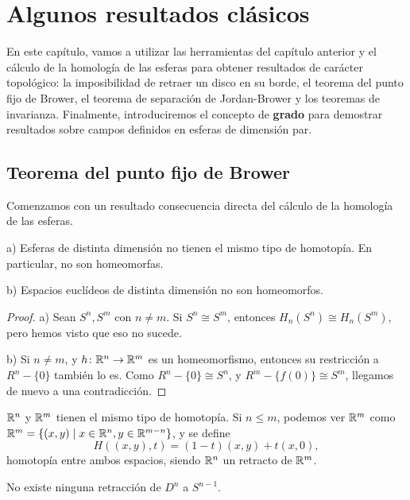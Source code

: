 \chapter{Algunos resultados clásicos}\label{ch:resultadosHom}

En este capítulo, vamos a utilizar las herramientas del capítulo anterior y el cálculo
de la homología de las esferas para obtener resultados de carácter topológico: la
imposibilidad de retraer un disco en su borde, el teorema del punto fijo de Brower,
el teorema de separación de Jordan-Brower y los teoremas de invarianza. Finalmente,
introduciremos el concepto de \textbf{grado} para demostrar resultados sobre campos
definidos en esferas de dimensión par.

\section{Teorema del punto fijo de Brower}

Comenzamos con un resultado consecuencia directa del cálculo de la homología de las esferas.

\begin{proposition}
  a) Esferas de distinta dimensión no tienen el mismo tipo de homotopía. En particular, no son homeomorfas.

  b) Espacios euclídeos de distinta dimensión no son homeomorfos.
\end{proposition}

\begin{proof}
  a) Sean $S^n, S^m$ con $n \neq m$. Si $S^n \cong S^m$, entonces $H_n(S^n) \cong H_n(S^m)$, pero hemos visto que eso no sucede.

  b) Si $n \neq m$, y $h \colon \mathbb{R}^n \to \mathbb{R}^m$ es un homeomorfismo, entonces su restricción a $R^n - \{0\}$ también lo es.
  Como $R^n - \{0\} \cong S^n$, y $R^m - \{f(0)\} \cong S^m$, llegamos de nuevo a una contradicción.
\end{proof}

\begin{remark}
  $\mathbb{R}^n$ y $\mathbb{R}^m$ tienen el mismo tipo de homotopía. Si $n \leq m$, podemos ver $\mathbb{R}^m$ como
  $\mathbb{R}^m = \{(x, y) \mid x \in \mathbb{R}^n, y \in \mathbb{R}^{m-n}\}$, y se define
  \[ H((x, y), t) = (1-t)(x, y) + t(x, 0), \]
  homotopía entre ambos espacios, siendo $\mathbb{R}^n$ un retracto de $\mathbb{R}^m$.
\end{remark}

\begin{lemma}
  No existe ninguna retracción de $D^n$ a $S^{n-1}$.
\end{lemma}

